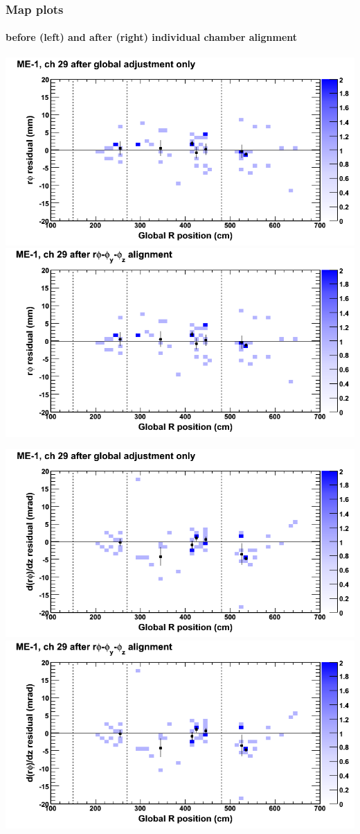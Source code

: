 \documentclass[compress]{beamer}
\begin{document}
\begin{frame}
\frametitle{Map plots}
\framesubtitle{before (left) and after (right) individual chamber alignment}
\includegraphics[width=0.5\linewidth]{ringmapplots_3dof/before_CSCvsr_mem1ch29_x.png} \includegraphics[width=0.5\linewidth]{ringmapplots_3dof/after_CSCvsr_mem1ch29_x.png}

\includegraphics[width=0.5\linewidth]{ringmapplots_3dof/before_CSCvsr_mem1ch29_dxdz.png} \includegraphics[width=0.5\linewidth]{ringmapplots_3dof/after_CSCvsr_mem1ch29_dxdz.png}
\end{frame}
\end{document}
